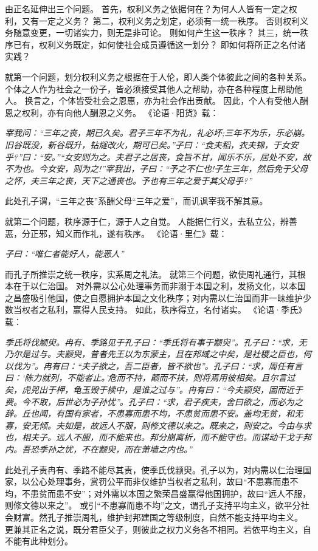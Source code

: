 \documentclass[11pt]{article}
\begin{document}
由正名延伸出三个问题。
首先，权利义务之依据何在？为何人人皆有一定之权利，又有一定之义务？
第二，权利义务之划定，必须有一统一秩序。
否则权利义务随意变更，一切诸实力，则无是非可论。
则如何产生这一秩序？
其三，统一秩序已有，权利义务既定，如何使社会成员遵循这一划分？
即如何将所正之名付诸实践？

\newline

就第一个问题，划分权利义务之根据在于人伦，即人类个体彼此之间的各种关系。
个体之人作为社会之一份子，皆必须接受其他人之帮助，亦在各种程度上帮助他人。
换言之，个体皆受社会之恩惠，亦为社会作出贡献。
因此，个人有受他人酬恩之权利，亦有向他人酬恩之义务。
《论语·阳货》载：

\textit{宰我问：“三年之丧，期已久矣。君子三年不为礼，礼必坏;三年不为乐，乐必崩。旧谷既没，新谷既升，钻燧改火，期可已矣。”子曰：“食夫稻，衣夫锦，于女安乎?”曰：“安。”“女安则为之。夫君子之居丧，食旨不甘，闻乐不乐，居处不安，故不为也。今女安，则为之!”宰我出，子曰：“予之不仁也!子生三年，然后免于父母之怀，夫三年之丧，天下之通丧也。予也有三年之爱于其父母乎?”}

此处孔子谓，“三年之丧”系酬父母“三年之爱”，而讥讽宰我不解其意。

就第二个问题，秩序源于仁，源于人之自觉。
人能据仁行义，去私立公，辨善恶，分正邪，知义而作礼，遂有秩序。
《论语·里仁》载：

\textit{子曰：“唯仁者能好人，能恶人”}

而孔子所推崇之统一秩序，实系周之礼法。
就第三个问题，欲使周礼通行，其根本在于以仁治国。
对外需以公心处理事务而非溺于本国之利，发扬文化，以本国之昌盛吸引他国，使之自愿拥护本国之文化秩序；对内需以仁治国而非一昧维护少数当权者之私利，赢得人民支持。
如此，秩序得立，名付诸实。
《论语·季氏》载：

\textit{季氏将伐颛臾。冉有、季路见于孔子曰：“季氏将有事于颛臾”。孔子曰：“求，无乃尔是过与。夫颛臾，昔者先王以为东蒙主，且在邦域之中矣，是社稷之臣也，何以伐为”。冉有曰：“夫子欲之，吾二臣者，皆不欲也”。孔子曰：“求，周任有言曰：‘陈力就列，不能者止。’危而不持，颠而不扶，则将焉用彼相矣。且尔言过矣，虎兕出于柙，龟玉毁于椟中，是谁之过与”。冉有曰：“今夫颛臾，固而近于费。今不取，后世必为子孙忧”。孔子曰：“求，君子疾夫，舍曰欲之，而必为之辞。丘也闻，有国有家者，不患寡而患不均，不患贫而患不安。盖均无贫，和无寡，安无倾。夫如是，故远人不服，则修文德以来之。既来之，则安之。今由与求也，相夫子。远人不服，而不能来也。邦分崩离析，而不能守也。而谋动干戈于邦内。吾恐季孙之忧，不在颛臾，而在萧墙之内也。”}

此处孔子责冉有、季路不能尽其责，使季氏伐颛臾。孔子以为，对内需以仁治理国家，以公心处理事务，赏罚公平而非仅维护当权者之私利，故曰“不患寡而患不均，不患贫而患不安”；对外需以本国之繁荣昌盛赢得他国拥护，故曰“远人不服，则修文德以来之”。
或引“不患寡而患不均”之文，谓孔子支持平均主义，欲平分社会财富。然孔子推崇周礼，维护封邦建国之等级制度，自然不能支持平均主义。
更兼其正名之说，既分君臣父子，则彼此之权力义务各不相同。若依平均主义，自不能有此种划分。
\end{document}
